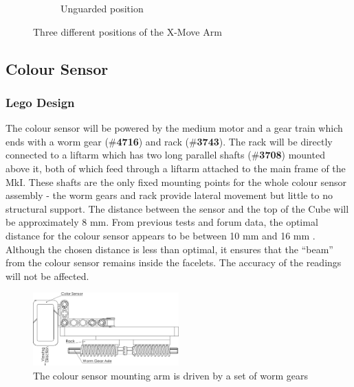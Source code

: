 \documentclass{report}
\newcommand{\tbo}[1]{\textbf{#1}}
\newcommand{\legopiece}[1]{(\#\tbo{#1})}
\begin{document}
\begin{figure}[H]
\begin{subfigure}[b]{0.30811\textwidth}
			\caption{Unguarded position}
			\label{fig:rdrXMoveArmV1_3}
		\end{subfigure}
		\caption{Three different positions of the X-Move Arm}
		\label{fig:rdrXMoveArmV1}
	\end{figure}
	

	\subsection{Colour Sensor}
	
	\subsubsection{Lego Design}
	
	The colour sensor will be powered by the medium motor and a gear train which ends with a worm gear \legopiece{4716} and rack \legopiece{3743}. The rack will be directly connected to a liftarm which has two long parallel shafts \legopiece{3708} mounted above it, both of which feed through a liftarm attached to the main frame of the MkI. These shafts are the only fixed mounting points for the whole colour sensor assembly - the worm gears and rack provide lateral movement but little to no structural support. The distance between the sensor and the top of the Cube will be approximately 8 \si{\milli\metre}. From previous tests and forum data, the optimal distance for the colour sensor appears to be between 10 \si{\milli\metre} and 16 \si{\milli\metre} \cite{UlfR2015}. Although the chosen distance is less than optimal, it ensures that the \enquote{beam} from the colour sensor remains inside the facelets. The accuracy of the readings will not be affected.
	
	\begin{figure}[H]
		\centering
		\includegraphics[width=0.5\textwidth]{Resources/Images/dwgColorSensor.png}
		\caption{The colour sensor mounting arm is driven by a set of worm gears}
		\label{fig:dwgColorSensor}
	\end{figure}
	
\end{document}
